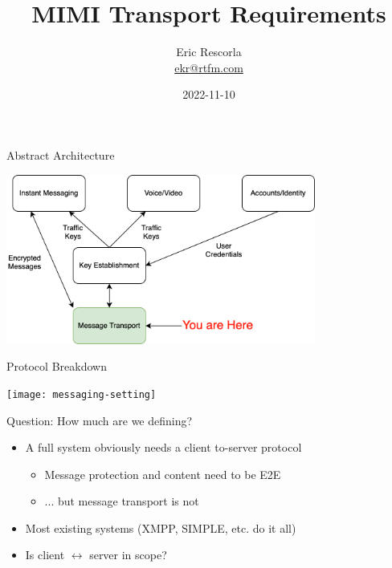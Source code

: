 \documentclass[helvetica]{beamer}
\title{MIMI Transport Requirements}
\author{Eric Rescorla \\\url{ekr@rtfm.com}}
\date{2022-11-10}
\begin{document}
\begin{frame}
  \titlepage
\end{frame}

\begin{frame}{Abstract Architecture}

  \vspace{.2in}
\begin{center}
  \includegraphics[width=4in]{messaging-architecture}
\end{center}
\end{frame}


\begin{frame}{Protocol Breakdown}

  \vspace{.2in}
\begin{center}
  \texttt{[image: messaging-setting]}
\end{center}
\end{frame}

\begin{frame}{Question: How much are we defining?}

  \begin{itemize}
  \item A full system obviously needs a client to-server protocol
    \begin{itemize}
    \item Message protection and content need to be E2E
    \item ... but message transport is not      
    \end{itemize}
  \item Most existing systems (XMPP, SIMPLE, etc. do it all)
  \item Is client $\longleftrightarrow$ server in scope?
  \end{itemize}  
\end{frame}
\end{document}
